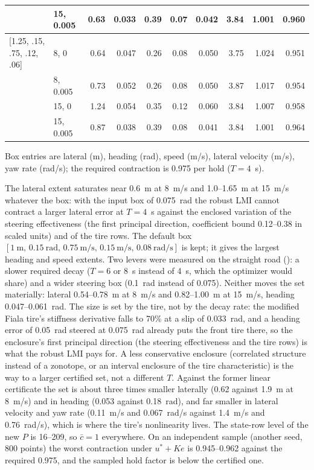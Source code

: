 \documentclass[11pt]{article}
\begin{document}
\begin{center}
\begin{tabular}{llrrrrrrrr}
 & 15, 0.005 & 0.63 & 0.033 & 0.39 & 0.07 & 0.042 & 3.84 & 1.001 & 0.960 \\
\midrule
{[1.25, .15, .75, .12, .06]} & 8, 0 & 0.64 & 0.047 & 0.26 & 0.08 & 0.050 & 3.75 & 1.024 & 0.951 \\
 & 8, 0.005 & 0.73 & 0.052 & 0.26 & 0.08 & 0.050 & 3.87 & 1.017 & 0.954 \\
 & 15, 0 & 1.24 & 0.054 & 0.35 & 0.12 & 0.060 & 3.84 & 1.007 & 0.958 \\
 & 15, 0.005 & 0.87 & 0.038 & 0.39 & 0.08 & 0.041 & 3.84 & 1.001 & 0.964 \\
\bottomrule
\end{tabular}
\end{center}
Box entries are lateral (m), heading (rad), speed (m/s), lateral velocity (m/s), yaw rate (rad/s); the required contraction is 0.975 per hold ($T=4$~s).

The lateral extent saturates near 0.6~m at 8~m/s and 1.0--1.65~m at 15~m/s
whatever the box: with the input box of 0.075~rad the robust LMI cannot
contract a larger lateral error at $T=4$~s against the enclosed variation of
the steering effectiveness (the first principal direction, coefficient
bound 0.12--0.38 in scaled units) and of the tire rows. The default box
$[1~\text{m},\,0.15~\text{rad},\,0.75~\text{m/s},\,0.15~\text{m/s},\,0.08~\text{rad/s}]$
is kept; it gives the largest heading and speed extents. Two levers were
measured on the straight road (): a slower
required decay ($T=6$ or 8~s instead of 4~s, which the optimizer would share)
and a wider steering box (0.1~rad instead of 0.075). Neither moves the set
materially: lateral 0.54--0.78~m at 8~m/s and 0.82--1.00~m at 15~m/s, heading
0.047--0.061~rad. The size is set by the tire, not by the decay rate: the
modified Fiala tire's stiffness derivative falls to 70\% at a slip of
0.033~rad, and a heading error of 0.05~rad steered at 0.075~rad already puts
the front tire there, so the enclosure's first principal direction (the
steering effectiveness and the tire rows) is what the robust LMI pays for.
A less conservative enclosure (correlated structure instead of a zonotope,
or an interval enclosure of the tire characteristic) is the way to a larger
certified set, not a different $T$. Against the former
linear certificate the set is about three times smaller laterally (0.62
against 1.9~m at 8~m/s) and in heading (0.053 against 0.18~rad), and far
smaller in lateral velocity and yaw rate (0.11~m/s and 0.067~rad/s against
1.4~m/s and 0.76~rad/s), which is where the tire's nonlinearity lives. The
state-row level of the new $P$ is 16--209, so $\bar c=1$ everywhere. On an
independent sample (another seed, 800 points) the worst contraction under
$u^*+Ke$ is 0.945--0.962 against the required 0.975, and the sampled hold
factor is below the certified one.
\end{document}
